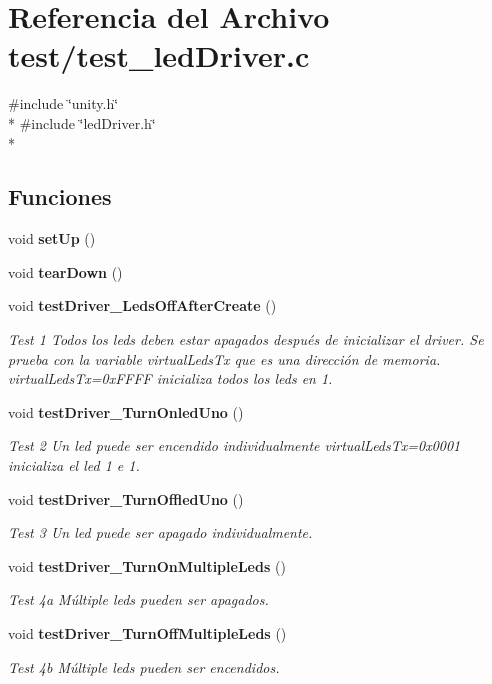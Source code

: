 \section{Referencia del Archivo test/test\-\_\-led\-Driver.c}
\label{test__led_driver_8c}
{\ttfamily \#include \char`\"{}unity.\-h\char`\"{}}\\*
{\ttfamily \#include \char`\"{}led\-Driver.\-h\char`\"{}}\\*
\subsection*{Funciones}
\begin{DoxyCompactItemize}
\item 
void {\bf set\-Up} ()
\item 
void {\bf tear\-Down} ()
\item 
void {\bf test\-Driver\-\_\-\-Leds\-Off\-After\-Create} ()
\begin{DoxyCompactList}\small\item\em Test 1 Todos los leds deben estar apagados después de inicializar el driver. Se prueba con la variable virtual\-Leds\-Tx que es una dirección de memoria. virtual\-Leds\-Tx=0x\-F\-F\-F\-F inicializa todos los leds en 1. \end{DoxyCompactList}\item 
void {\bf test\-Driver\-\_\-\-Turn\-Onled\-Uno} ()
\begin{DoxyCompactList}\small\item\em Test 2 Un led puede ser encendido individualmente virtual\-Leds\-Tx=0x0001 inicializa el led 1 e 1. \end{DoxyCompactList}\item 
void {\bf test\-Driver\-\_\-\-Turn\-Offled\-Uno} ()
\begin{DoxyCompactList}\small\item\em Test 3 Un led puede ser apagado individualmente. \end{DoxyCompactList}\item 
void {\bf test\-Driver\-\_\-\-Turn\-On\-Multiple\-Leds} ()
\begin{DoxyCompactList}\small\item\em Test 4a Múltiple leds pueden ser apagados. \end{DoxyCompactList}\item 
void {\bf test\-Driver\-\_\-\-Turn\-Off\-Multiple\-Leds} ()
\begin{DoxyCompactList}\small\item\em Test 4b Múltiple leds pueden ser encendidos. \end{DoxyCompactList}\item 

\end{DoxyCompactItemize}
